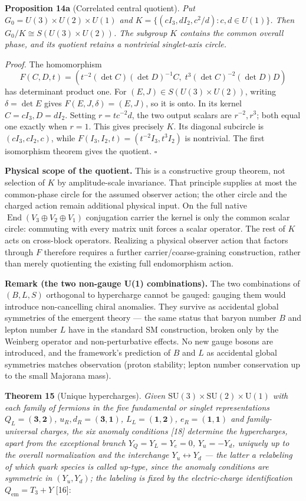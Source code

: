 \documentclass[
]{article}
\begin{document}
\textbf{Proposition 14a} (Correlated central quotient). \emph{Put
\(G_0=U(3)\times U(2)\times U(1)\) and
\(K=\{(cI_3,dI_2,c^2/d):c,d\in U(1)\}\). Then
\(G_0/K\cong S(U(3)\times U(2))\). The subgroup \(K\) contains the
common overall phase, and its quotient retains a nontrivial singlet-axis
circle.}

\emph{Proof.} The homomorphism
\[F(C,D,t)=\left(t^{-2}(\det C)(\det D)^{-1}C,\;t^3(\det C)^{-2}(\det D)D\right)\]
has determinant product one. For \((E,J)\in S(U(3)\times U(2))\),
writing \(\delta=\det E\) gives \(F(E,J,\delta)=(E,J)\), so it is onto.
In its kernel \(C=cI_3,D=dI_2\). Setting \(r=t c^{-2}d\), the two output
scalars are \(r^{-2},r^3\); both equal one exactly when \(r=1\). This
gives precisely \(K\). Its diagonal subcircle is \((cI_3,cI_2,c)\),
while \(F(I_3,I_2,t)=(t^{-2}I_3,t^3I_2)\) is nontrivial. The first
isomorphism theorem gives the quotient. \(\square\)

\textbf{Physical scope of the quotient.} This is a constructive group
theorem, not selection of \(K\) by amplitude-scale invariance. That
principle supplies at most the common-phase circle for the assumed
observer action; the other circle and the charged action remain
additional physical input. On the full native
\(\operatorname{End}(V_3\oplus V_2\oplus V_1)\) conjugation carrier the
kernel is only the common scalar circle: commuting with every matrix
unit forces a scalar operator. The rest of \(K\) acts on cross-block
operators. Realizing a physical observer action that factors through
\(F\) therefore requires a further carrier/coarse-graining construction,
rather than merely quotienting the existing full endomorphism action.

\textbf{Remark (the two non-gauge U(1) combinations).} The two
combinations of \((B, L, S)\) orthogonal to hypercharge cannot be
gauged: gauging them would introduce non-cancelling chiral anomalies.
They survive as accidental global symmetries of the emergent theory ---
the same status that baryon number \(B\) and lepton number \(L\) have in
the standard SM construction, broken only by the Weinberg operator and
non-perturbative effects. No new gauge bosons are introduced, and the
framework's prediction of \(B\) and \(L\) as accidental global
symmetries matches observation (proton stability; lepton number
conservation up to the small Majorana mass).

\textbf{Theorem 15} (Unique hypercharges). \emph{Given
\(\mathrm{SU}(3) \times \mathrm{SU}(2) \times \mathrm{U}(1)\) with each
family of fermions in the five fundamental or singlet representations
\(Q_L = (\mathbf{3}, \mathbf{2})\),
\(u_R, d_R = (\mathbf{3}, \mathbf{1})\),
\(L_L = (\mathbf{1}, \mathbf{2})\), \(e_R = (\mathbf{1}, \mathbf{1})\)
and family-universal charges, the six anomaly conditions {[}18{]}
determine the hypercharges, apart from the exceptional branch
\(Y_Q = Y_L = Y_e = 0\), \(Y_u = -Y_d\), uniquely up to the overall
normalization and the interchange \(Y_u \leftrightarrow Y_d\) --- the
latter a relabeling of which quark species is called up-type, since the
anomaly conditions are symmetric in \((Y_u, Y_d)\); the labeling is
fixed by the electric-charge identification
\(Q_{\mathrm{em}} = T_3 + Y\)} {[}16{]}:
\end{document}
